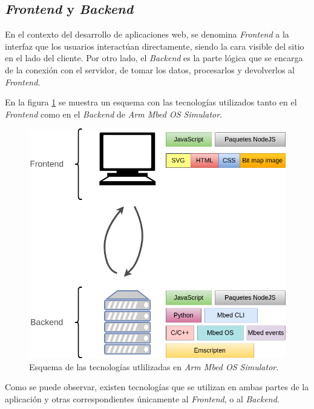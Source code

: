 \subsection{\textit{Frontend} y \textit{Backend}}

En el contexto del desarrollo de aplicaciones web, se denomina \textit{Frontend} a la interfaz que los usuarios interactúan directamente, siendo la cara visible del sitio en el lado del cliente. Por otro lado, el \textit{Backend} es la parte lógica que se encarga de la conexión con el servidor, de tomar los datos, procesarlos y devolverlos al \textit{Frontend}. 



En la figura \ref{fig:FrontendBackendMbed} se muestra un esquema con las tecnologías utilizados tanto en el \textit{Frontend} como en el \textit{Backend} de \textit{Arm Mbed OS Simulator}.

\begin{figure}[ht]
	\centering
	\includegraphics[scale=.47]{./Figures/FrontendBackendMbed.png}
	\caption{Esquema de las tecnologías utlilizadas en \textit{Arm Mbed OS Simulator}.}
	\label{fig:FrontendBackendMbed}
\end{figure}

Como se puede observar, existen tecnologías que se utilizan en ambas partes de la aplicación y otras correspondientes únicamente al \textit{Frontend}, o al \textit{Backend}.


